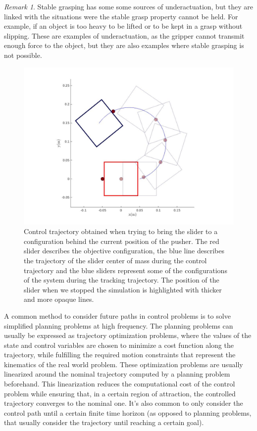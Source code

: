 \documentclass[12,twoside]{TFG-GM}
\theoremstyle{definition}
\theoremstyle{remark}
\newtheorem{remark}[theorem]{Remark}
\begin{document}
\begin{remark} \label{rem:underactuation}
Stable grasping has some some sources of underactuation, but they are linked with the situations were the stable grasp property cannot be held. For example, if an object is too heavy to be lifted or to be kept in a grasp without slipping. These are examples of underactuation, as the gripper cannot transmit enough force to the object, but they are also examples where stable grasping is not possible.
\end{remark}


\begin{figure}[htb!]
\begin{center}
\includegraphics[width=15cm]{underactuation.jpg}
\end{center}
\caption[test caption]{\label{fig:underactuation} \small{Control trajectory obtained when trying to bring the slider to a configuration behind the current position of the pusher. The red slider describes the objective configuration, the blue line describes the trajectory of the slider center of mass during the control trajectory and the blue sliders represent some of the configurations of the system during the tracking trajectory. The position of the slider when we stopped the simulation is highlighted with thicker and more opaque lines.}}
\end{figure}

A common method to consider future paths in control problems is to solve simplified planning problems at high frequency. The planning problems can usually be expressed as trajectory optimization problems, where the values of the state and control variables are chosen to minimize a cost function along the trajectory, while fulfilling the required motion constraints that represent the kinematics of the real world problem. These optimization problems are usually linearized around the nominal trajectory computed by a planning problem beforehand. This linearization reduces the computational cost of the control problem while ensuring that, in a certain region of attraction, the controlled trajectory converges to the nominal one. It's also common to only consider the control path until a certain finite time horizon (as opposed to planning problems, that usually consider the trajectory until reaching a certain goal).
\end{document}
